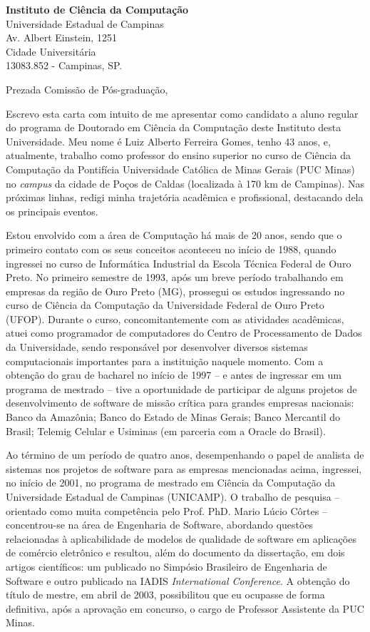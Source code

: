 \documentclass[11pt]{letter}
\begin{document}
\begin{flushleft}
\textbf{Instituto de Ciência da Computação}\\
Universidade Estadual de Campinas\\ 
Av. Albert Einstein, 1251\\
Cidade Universitária\\
13083.852 - Campinas, SP. 
\end{flushleft}


Prezada Comissão de Pós-graduação,

Escrevo esta carta com intuito de me apresentar como candidato a aluno regular do programa de Doutorado em Ciência da Computação deste Instituto desta Universidade. Meu nome é Luiz Alberto Ferreira Gomes, tenho 43 anos, e, atualmente, trabalho como professor do ensino 
superior no curso de Ciência da Computação da Pontifícia Universidade Católica de Minas Gerais (PUC Minas) no \textit{campus} da cidade de Poços de Caldas (localizada à 
170 km de Campinas). Nas próximas linhas, redigi minha trajetória acadêmica e profissional, destacando dela os principais eventos.

Estou envolvido com a área de Computação há mais de 20 anos, sendo que o primeiro contato com os seus conceitos aconteceu no início de 1988, quando ingressei no 
curso de Informática Industrial da Escola Técnica Federal de Ouro Preto. No primeiro semestre de 1993, após um breve período trabalhando em empresas da região de 
Ouro Preto (MG), prossegui os estudos ingressando no curso de Ciência da Computação da Universidade Federal de Ouro Preto (UFOP). Durante o curso, concomitantemente 
com as atividades acadêmicas, atuei como programador de computadores do Centro de Processamento de Dados da Universidade, sendo responsável por desenvolver diversos 
sistemas computacionais importantes para a instituição naquele momento. Com a obtenção do grau de bacharel no início de 1997 – e antes de ingressar em um programa 
de mestrado – tive a oportunidade de participar de alguns projetos de desenvolvimento de software de missão crítica para grandes empresas nacionais: Banco da Amazônia; 
Banco do Estado de Minas Gerais; Banco Mercantil do Brasil; Telemig Celular e Usiminas (em parceria com a Oracle do Brasil).

Ao término de um período de quatro anos, desempenhando o papel de analista de sistemas nos projetos de software para as empresas mencionadas acima, ingressei, no 
início de 2001, no programa de mestrado em Ciência da Computação da Universidade Estadual de Campinas (UNICAMP). O trabalho de pesquisa – orientado como muita 
competência pelo Prof. PhD. Mario Lúcio Côrtes – concentrou-se na área de Engenharia de Software, abordando questões relacionadas à aplicabilidade de modelos de 
qualidade de software em aplicações de comércio eletrônico e resultou, além do documento da dissertação, em dois artigos científicos: um publicado no 
Simpósio Brasileiro de Engenharia de Software e outro publicado na IADIS \textit{International Conference}. A obtenção do título de mestre, em abril de 2003, possibilitou 
que eu ocupasse de forma definitiva, após a aprovação em concurso, o cargo de Professor Assistente da PUC Minas.
\end{document}
